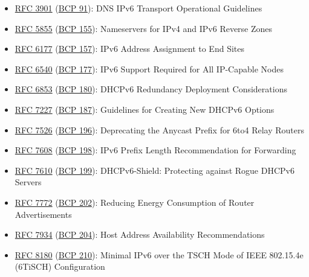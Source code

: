 \documentclass[
]{article}
\providecommand{\tightlist}{%
  \setlength{\itemsep}{0pt}\setlength{\parskip}{0pt}}
\begin{document}
\begin{itemize}
\tightlist
\item
  \href{https://www.rfc-editor.org/info/rfc3901}{RFC 3901}
  (\href{https://www.rfc-editor.org/info/bcp91}{BCP 91}): DNS IPv6
  Transport Operational Guidelines
\item
  \href{https://www.rfc-editor.org/info/rfc5855}{RFC 5855}
  (\href{https://www.rfc-editor.org/info/bcp155}{BCP 155}): Nameservers
  for IPv4 and IPv6 Reverse Zones
\item
  \href{https://www.rfc-editor.org/info/rfc6177}{RFC 6177}
  (\href{https://www.rfc-editor.org/info/bcp157}{BCP 157}): IPv6 Address
  Assignment to End Sites
\item
  \href{https://www.rfc-editor.org/info/rfc6540}{RFC 6540}
  (\href{https://www.rfc-editor.org/info/bcp177}{BCP 177}): IPv6 Support
  Required for All IP-Capable Nodes
\item
  \href{https://www.rfc-editor.org/info/rfc6853}{RFC 6853}
  (\href{https://www.rfc-editor.org/info/bcp180}{BCP 180}): DHCPv6
  Redundancy Deployment Considerations
\item
  \href{https://www.rfc-editor.org/info/rfc7227}{RFC 7227}
  (\href{https://www.rfc-editor.org/info/bcp187}{BCP 187}): Guidelines
  for Creating New DHCPv6 Options
\item
  \href{https://www.rfc-editor.org/info/rfc7526}{RFC 7526}
  (\href{https://www.rfc-editor.org/info/bcp196}{BCP 196}): Deprecating
  the Anycast Prefix for 6to4 Relay Routers
\item
  \href{https://www.rfc-editor.org/info/rfc7608}{RFC 7608}
  (\href{https://www.rfc-editor.org/info/bcp198}{BCP 198}): IPv6 Prefix
  Length Recommendation for Forwarding
\item
  \href{https://www.rfc-editor.org/info/rfc7610}{RFC 7610}
  (\href{https://www.rfc-editor.org/info/bcp199}{BCP 199}):
  DHCPv6-Shield: Protecting against Rogue DHCPv6 Servers
\item
  \href{https://www.rfc-editor.org/info/rfc7772}{RFC 7772}
  (\href{https://www.rfc-editor.org/info/bcp202}{BCP 202}): Reducing
  Energy Consumption of Router Advertisements
\item
  \href{https://www.rfc-editor.org/info/rfc7934}{RFC 7934}
  (\href{https://www.rfc-editor.org/info/bcp204}{BCP 204}): Host Address
  Availability Recommendations
\item
  \href{https://www.rfc-editor.org/info/rfc8180}{RFC 8180}
  (\href{https://www.rfc-editor.org/info/bcp210}{BCP 210}): Minimal IPv6
  over the TSCH Mode of IEEE 802.15.4e (6TiSCH) Configuration

\end{itemize}
\end{document}
